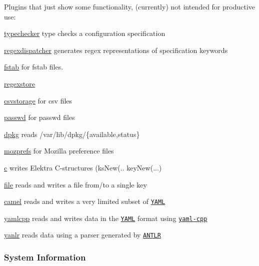 Plugins that just show some functionality, (currently) not intended for productive use\+:


\begin{DoxyItemize}
\item \hyperlink{md_src_plugins_typechecker_README_src_plugins_typechecker_README_md}{typechecker} type checks a configuration specification
\item \hyperlink{md_src_plugins_regexdispatcher_README_src_plugins_regexdispatcher_README_md}{regexdispatcher} generates regex representations of specification keywords
\item \hyperlink{md_src_plugins_fstab_README_src_plugins_fstab_README_md}{fstab} for fstab files.
\item \hyperlink{md_src_plugins_regexstore_README_src_plugins_regexstore_README_md}{regexstore}
\item \hyperlink{md_src_plugins_csvstorage_README_src_plugins_csvstorage_README_md}{csvstorage} for csv files
\item \hyperlink{md_src_plugins_passwd_README_src_plugins_passwd_README_md}{passwd} for passwd files
\item \hyperlink{md_src_plugins_dpkg_README_src_plugins_dpkg_README_md}{dpkg} reads /var/lib/dpkg/\{available,status\}
\item \hyperlink{md_src_plugins_mozprefs_README_src_plugins_mozprefs_README_md}{mozprefs} for Mozilla preference files
\item \hyperlink{md_src_plugins_c_README_src_plugins_c_README_md}{c} writes Elektra C-\/structures ({\ttfamily ks\+New(.. key\+New(...})
\item \hyperlink{md_src_plugins_file_README_src_plugins_file_README_md}{file} reads and writes a file from/to a single key
\item \hyperlink{md_src_plugins_camel_README_src_plugins_camel_README_md}{camel} reads and writes a very limited subset of \href{http://www.yaml.org}{\tt Y\+A\+ML}
\item \hyperlink{md_src_plugins_yamlcpp_README_src_plugins_yamlcpp_README_md}{yamlcpp} reads and writes data in the \href{http://www.yaml.org}{\tt Y\+A\+ML} format using \href{https://github.com/jbeder/yaml-cpp}{\tt yaml-\/cpp}
\item \hyperlink{md_src_plugins_yanlr_README_src_plugins_yanlr_README_md}{yanlr} reads data using a parser generated by \href{http://www.antlr.org}{\tt A\+N\+T\+LR}
\end{DoxyItemize}

\subsubsection*{System Information}

